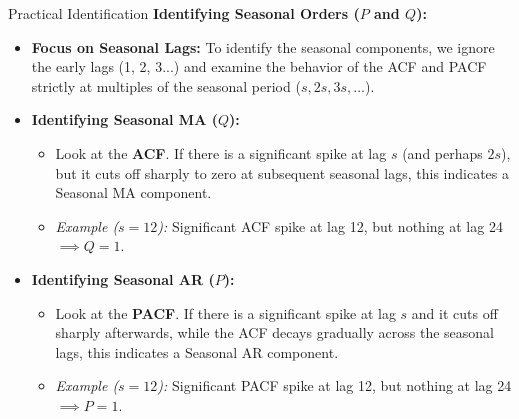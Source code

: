 \documentclass[aspectratio=169]{beamer}
\begin{document}
\begin{frame}{Practical Identification}
\textbf{Identifying Seasonal Orders ($P$ and $Q$):}
\begin{itemize}
    \item \textbf{Focus on Seasonal Lags:} To identify the seasonal components, we ignore the early lags (1, 2, 3...) and examine the behavior of the ACF and PACF strictly at multiples of the seasonal period ($s, 2s, 3s, \dots$).
    
    \vspace{0.3cm}
    
    \item \textbf{Identifying Seasonal MA ($Q$):}
    \begin{itemize}
        \item Look at the \textbf{ACF}. If there is a significant spike at lag $s$ (and perhaps $2s$), but it cuts off sharply to zero at subsequent seasonal lags, this indicates a Seasonal MA component.
        \item \textit{Example ($s=12$):} Significant ACF spike at lag 12, but nothing at lag 24 $\implies Q=1$.
    \end{itemize}
    
    \vspace{0.3cm}
    
    \item \textbf{Identifying Seasonal AR ($P$):}
    \begin{itemize}
        \item Look at the \textbf{PACF}. If there is a significant spike at lag $s$ and it cuts off sharply afterwards, while the ACF decays gradually across the seasonal lags, this indicates a Seasonal AR component.
        \item \textit{Example ($s=12$):} Significant PACF spike at lag 12, but nothing at lag 24 $\implies P=1$.
    \end{itemize}
\end{itemize}
\end{frame}
\end{document}
